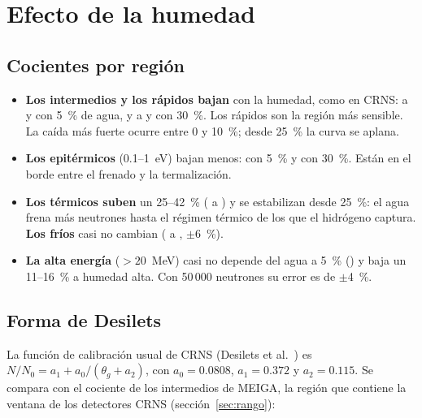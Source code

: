 \documentclass[11pt,a4paper]{article}
\newcommand{\tablaancha}[1]{\resizebox{\linewidth}{!}{}}
\begin{document}
\section{Efecto de la humedad}
\subsection{Cocientes por región}
\begin{table}[H]
	\centering
	\caption{Flujo que sube con agua dividido por el del suelo seco de MEIGA, por región (tabla~\ref{tab:clasif}; sin
		los ultrafríos, que casi no tienen cruces), con los mismos 50\,000 neutrones de entrada. Errores: estadística de Poisson de los dos conteos (conservadores, porque las entradas son las mismas).
		Albedo: neutrones que suben por neutrón que baja, con esos mismos neutrones. Última columna: la banda de 10~meV a 10~eV.}\label{tab:reg}
	\footnotesize\setlength\tabcolsep{4pt}
\tablaancha{regiones}

\end{table}

\begin{itemize}
\item \textbf{Los intermedios y los rápidos bajan} con la humedad, como en CRNS: a \IntCinco{} y \RapCinco{} con
5~\% de agua, y a \IntTreinta{} y \RapTreinta{} con 30~\%. Los rápidos son la región más sensible. La caída más fuerte
ocurre entre 0 y 10~\%; desde 25~\% la curva se aplana.
\item \textbf{Los epitérmicos} (0.1--1~eV) bajan menos: \EpiCinco{} con 5~\% y \EpiTreinta{} con 30~\%. Están en el
borde entre el frenado y la termalización.
\item \textbf{Los térmicos suben} un 25--42~\% (\TerCinco{} a \TerTreinta) y se estabilizan desde 25~\%: el agua frena
más neutrones hasta el régimen térmico de los que el hidrógeno captura. \textbf{Los fríos} casi no cambian
(\FriCinco{} a \FriTreinta, $\pm$6~\%).
\item \textbf{La alta energía} ($>20$~MeV) casi no depende del agua a 5~\% (\AltCinco) y baja un 11--16~\% a humedad
alta. Con 50\,000 neutrones su error es de $\pm$4~\%.
\end{itemize}

\subsection{Forma de Desilets}\label{sec:des}
La función de calibración usual de CRNS (Desilets et al.~\cite{Desilets2010}) es $N/N_0 = a_1 + a_0/(\theta_g + a_2)$, con
$a_0 = 0.0808$, $a_1 = 0.372$ y $a_2 = 0.115$. Se compara con el cociente de los intermedios de MEIGA, la región que
contiene la ventana de los detectores CRNS (sección~\ref{sec:rango}):
\end{document}
